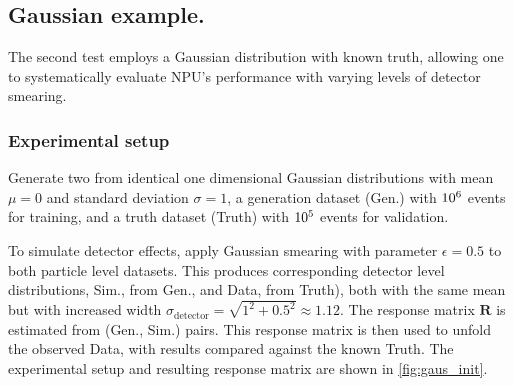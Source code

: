 \subsection{Gaussian example.}
    The second test employs a Gaussian distribution with known truth, allowing one to systematically evaluate NPU's performance with varying levels of detector smearing. 
    \subsubsection{Experimental setup}
Generate two from identical one dimensional Gaussian distributions with mean $\mu = 0$ and standard deviation $\sigma = 1$,
a generation dataset ({Gen.}) with $\num{d6}$ events for training, and a truth dataset ({Truth}) with $\num{d5}$ events for validation.

To simulate detector effects, apply Gaussian smearing with parameter $\epsilon = 0.5$ to both particle level datasets.
%
This produces corresponding detector level distributions, {Sim.}, from Gen., and {Data}, from Truth), both with the same mean but with increased width $\sigma_\text{detector} = \sqrt{1^2 + 0.5^2} \approx 1.12$.
%
The response matrix $\mathbf{R}$ is estimated from (Gen., Sim.) pairs.
%
This response matrix is then used to unfold the observed Data, with results compared against the known Truth.
%
The experimental setup and resulting response matrix are shown in \cref{fig:gaus_init}.
